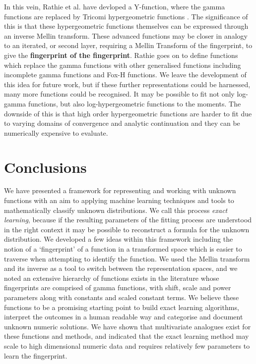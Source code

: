 \documentclass{article}
\begin{document}
In this vein, Rathie et al. have devloped a Y-function, where the gamma functions are replaced by Tricomi hypergeometric functions \cite{Rathie2013}. The significance of this is that these hypergeometric functions themselves can be expressed through an inverse Mellin transform. These advanced functions may be closer in analogy to an iterated, or second layer, requiring a Mellin Transform of the fingerprint, to give the \textbf{fingerprint of the fingerprint}. Rathie goes on to define functions which replace the gamma functions with other generalised functions including incomplete gamma functions and Fox-H functions. We leave the development of this idea for future work, but if these further representations could be harnessed, many more functions could be recognised. It may be possible to fit not only log-gamma functions, but also log-hypergeometric functions to the moments. The downside of this is that high order hypergeometric functions are harder to fit due to varying domains of convergence and analytic continuation and they can be numerically expensive to evaluate. 

\section{Conclusions}
We have presented a framework for representing and working with unknown functions with an aim to applying machine learning techniques and tools to mathematically classify unknown distributions. We call this process \emph{exact learning}, because if the resulting parameters of the fitting process are understood in the right context it may be possible to reconstruct a formula for the unknown distribution. We developed a few ideas within this framework including the notion of a `fingerprint' of a function in a transformed space which is easier to traverse when attempting to identify the function. We used the Mellin transform and its inverse as a tool to switch between the representation spaces, and we noted an extensive hierarchy of functions exists in the literature whose fingerprints are comprised of gamma functions, with shift, scale and power parameters along with constants and scaled constant terms. We believe these functions to be a promising starting point to build exact learning algorithms, interpret the outcomes in a human readable way and categorise and document unknown numeric solutions. We have shown that multivariate analogues exist for these functions and methods, and indicated that the exact learning method may scale to high dimensional numeric data and requires relatively few parameters to learn the fingerprint.\\
\end{document}
